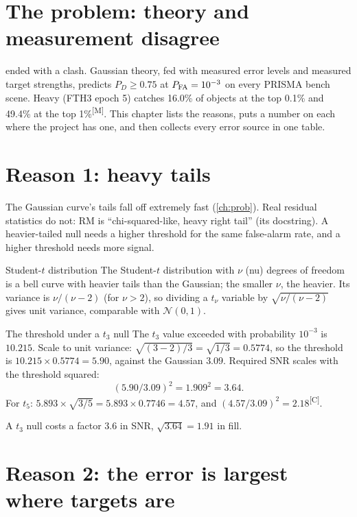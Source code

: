 \documentclass[11pt,a4paper,oneside,openany]{book}
\newcommand{\meas}{\textsuperscript{\textsf{\scriptsize[M]}}}
\newcommand{\comp}{\textsuperscript{\textsf{\scriptsize[C]}}}
\begin{document}
\section{The problem: theory and measurement disagree}

 ended with a clash. Gaussian theory, fed with measured error levels and measured target strengths, predicts $P_D\ge0.75$ at $P_{\rm FA}=10^{-3}$ on every
PRISMA bench scene. Heavy (FTH3 epoch 5) catches 16.0\% of objects at the top 0.1\% and 49.4\% at the top 1\%\meas. This chapter lists the reasons, puts a number on
each where the project has one, and then collects every error source in one table.

\section{Reason 1: heavy tails}

The Gaussian curve's tails fall off extremely fast (\cref{ch:prob}). Real residual statistics do not: RM is ``chi-squared-like, heavy right tail'' (its docstring). A
heavier-tailed null needs a higher threshold for the same false-alarm rate, and a higher threshold needs more signal.

\begin{defn}{Student-$t$ distribution}
The Student-$t$ distribution with $\nu$ (nu) degrees of freedom is a bell curve with heavier tails than the Gaussian; the smaller $\nu$, the heavier. Its variance is
$\nu/(\nu-2)$ (for $\nu>2$), so dividing a $t_\nu$ variable by $\sqrt{\nu/(\nu-2)}$ gives unit variance, comparable with $\mathcal N(0,1)$.
\end{defn}

\begin{worked}[label=we:tails]{The threshold under a $t_3$ null}
The $t_3$ value exceeded with probability $10^{-3}$ is $10.215$. Scale to unit variance: $\sqrt{(3-2)/3}=\sqrt{1/3}=0.5774$, so the threshold is
$10.215\times0.5774=5.90$, against the Gaussian $3.09$. Required SNR scales with the threshold squared:
\[
  (5.90/3.09)^2=1.909^2=3.64 .
\]
For $t_5$: $5.893\times\sqrt{3/5}=5.893\times0.7746=4.57$, and $(4.57/3.09)^2=2.18$\comp.
\end{worked}

A $t_3$ null costs a factor 3.6 in SNR, $\sqrt{3.64}=1.91$ in fill.

\section{Reason 2: the error is largest where targets are}
\end{document}

